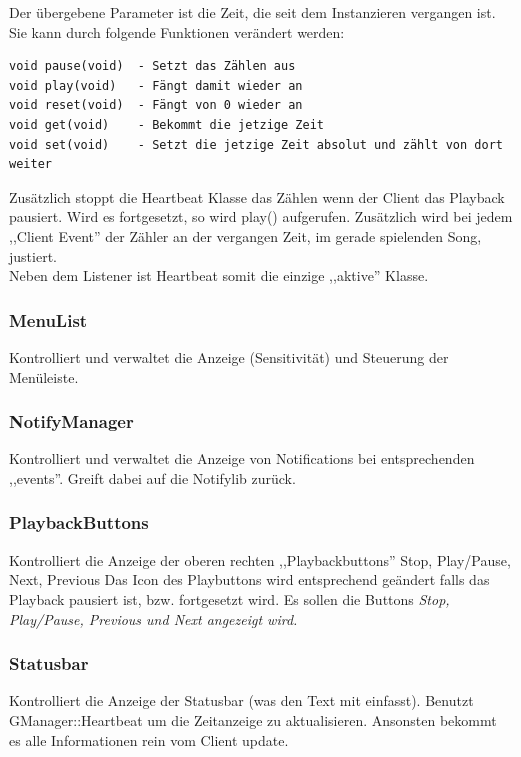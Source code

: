 Der übergebene Parameter ist die Zeit, die seit dem Instanzieren vergangen ist. 
Sie kann durch folgende Funktionen verändert werden:
\begin{verbatim}
void pause(void)  - Setzt das Zählen aus
void play(void)   - Fängt damit wieder an
void reset(void)  - Fängt von 0 wieder an
void get(void)    - Bekommt die jetzige Zeit
void set(void)    - Setzt die jetzige Zeit absolut und zählt von dort weiter
\end{verbatim}

Zusätzlich stoppt die Heartbeat Klasse das Zählen wenn der Client das Playback pausiert.
Wird es fortgesetzt, so wird play() aufgerufen. 
Zusätzlich wird bei jedem ,,Client Event'' der Zähler an der vergangen Zeit, im gerade spielenden Song, justiert.
\\
Neben dem Listener ist Heartbeat somit die einzige ,,aktive'' Klasse.

\subsubsection{MenuList}
Kontrolliert und verwaltet die Anzeige (Sensitivität) und Steuerung der Menüleiste.

\subsubsection{NotifyManager}
Kontrolliert und verwaltet die Anzeige von Notifications bei entsprechenden ,,events''.
Greift dabei auf die Notifylib zurück.

\subsubsection{PlaybackButtons}
Kontrolliert die Anzeige der oberen rechten ,,Playbackbuttons'' Stop, Play/Pause, Next, Previous
Das Icon des Playbuttons wird entsprechend geändert falls das Playback pausiert ist,
bzw. fortgesetzt wird. Es sollen die Buttons \it Stop, Play/Pause, Previous und Next \rm angezeigt wird.

\subsubsection{Statusbar}
Kontrolliert die Anzeige der Statusbar (was den Text mit einfasst). 
Benutzt GManager::Heartbeat um die Zeitanzeige zu aktualisieren. Ansonsten bekommt es alle Informationen rein vom Client update.

